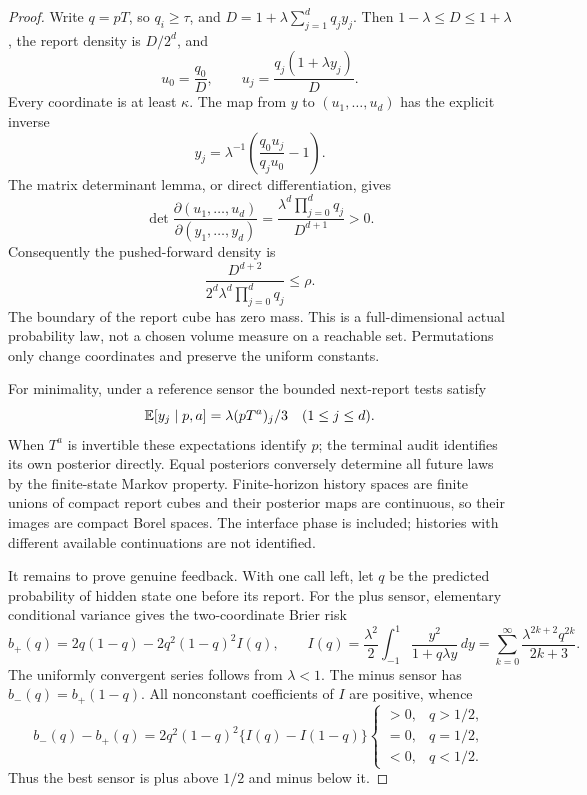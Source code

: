 \begin{proof}
Write $q=pT$, so $q_i\ge\tau$, and $D=1+\lambda\sum_{j=1}^dq_jy_j$. Then $1-\lambda\le D\le1+\lambda$, the report density is $D/2^d$, and
\begin{equation}\label{eq:rawposterior}
 u_0=\frac{q_0}{D},\qquad u_j=\frac{q_j(1+\lambda y_j)}{D}.
\end{equation}
Every coordinate is at least $\kappa$. The map from $y$ to $(u_1,\ldots,u_d)$ has the explicit inverse
\[
 y_j=\lambda^{-1}\left(\frac{q_0u_j}{q_ju_0}-1\right).
\]
The matrix determinant lemma, or direct differentiation, gives
\begin{equation}\label{eq:posteriorjacobian}
 \det\frac{\partial(u_1,\ldots,u_d)}{\partial(y_1,\ldots,y_d)}
    =\frac{\lambda^d\prod_{j=0}^d q_j}{D^{d+1}}>0.
\end{equation}
Consequently the pushed-forward density is
\[
 \frac{D^{d+2}}{2^d\lambda^d\prod_{j=0}^d q_j}\le\rho.
\]
The boundary of the report cube has zero mass. This is a full-dimensional actual probability law, not a chosen volume measure on a reachable set. Permutations only change coordinates and preserve the uniform constants.

For minimality, under a reference sensor the bounded next-report tests satisfy
\[
 \mathbb E[y_j\mid p,a]=\lambda(pT^a)_j/3\quad(1\le j\le d).
\]
When $T^a$ is invertible these expectations identify $p$; the terminal audit identifies its own posterior directly. Equal posteriors conversely determine all future laws by the finite-state Markov property. Finite-horizon history spaces are finite unions of compact report cubes and their posterior maps are continuous, so their images are compact Borel spaces. The interface phase is included; histories with different available continuations are not identified.

It remains to prove genuine feedback. With one call left, let $q$ be the predicted probability of hidden state one before its report. For the plus sensor, elementary conditional variance gives the two-coordinate Brier risk
\begin{equation}\label{eq:onesensorvalue}
 b_+(q)=2q(1-q)-2q^2(1-q)^2I(q),\qquad
 I(q)=\frac{\lambda^2}{2}\int_{-1}^1\frac{y^2}{1+q\lambda y}\,dy
     =\sum_{k=0}^\infty\frac{\lambda^{2k+2}q^{2k}}{2k+3}.
\end{equation}
The uniformly convergent series follows from $\lambda<1$. The minus sensor has $b_-(q)=b_+(1-q)$. All nonconstant coefficients of $I$ are positive, whence
\begin{equation}\label{eq:threshold}
 b_-(q)-b_+(q)=2q^2(1-q)^2\{I(q)-I(1-q)\}
 \begin{cases}>0,&q>1/2,\\=0,&q=1/2,\\<0,&q<1/2.\end{cases}
\end{equation}
Thus the best sensor is plus above $1/2$ and minus below it.


\end{proof}
